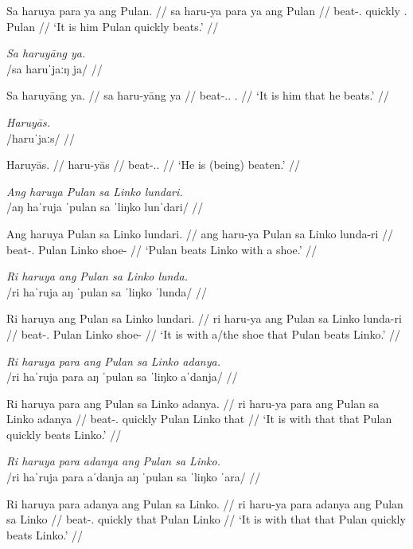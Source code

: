 \documentclass[12pt,a4paper]{scrartcl}
\newcommand{\TsgM}{{\Tsg}.{\M}}
\begin{document}
\gla Sa haruya para ya ang Pulan. //
\glb sa haru-ya para ya ang Pulan //
\glc \PatT{} beat-\TsgM{} quickly \TsgM{} \Aarg{} Pulan //
\glft `It is him Pulan quickly beats.' //
\endgl\xe

\ex\begingl
\glpreamble \textit{Sa haruyāng ya.}\\
	/sa haruˈjaːŋ ja/ //

\gla Sa haruyāng ya. //
\glb sa haru-yāng ya //
\glc \PatT{} beat-\TsgM{}.\Aarg{} \TsgM{} //
\glft `It is him that he beats.' //
\endgl\xe

\ex\begingl
\glpreamble \textit{Haruyās.}\\
	/haruˈjaːs/ //

\gla Haruyās. //
\glb haru-yās //
\glc beat-\TsgM{}.\Parg{} //
\glft `He is (being) beaten.' //
\endgl\xe

\ex\begingl
\glpreamble \textit{Ang haruya Pulan sa Linko lundari.}\\
	/aŋ haˈruja ˈpulan sa ˈliŋko lunˈdari/ //

\gla Ang haruya Pulan sa Linko lundari. //
\glb ang haru-ya Pulan sa Linko lunda-ri //
\glc \AgtT{} beat-\TsgM{} Pulan \Parg{} Linko shoe-\Ins{} //
\glft `Pulan beats Linko with a shoe.' //
\endgl\xe

\ex\begingl
\glpreamble \textit{Ri haruya ang Pulan sa Linko lunda.}\\
	/ri haˈruja aŋ ˈpulan sa ˈliŋko ˈlunda/ //

\gla Ri haruya ang Pulan sa Linko lundari. //
\glb ri haru-ya ang Pulan sa Linko lunda-ri //
\glc \InsT{} beat-\TsgM{} \Aarg{} Pulan \Parg{} Linko shoe-\Ins{} //
\glft `It is with a/the shoe that Pulan beats Linko.' //
\endgl\xe


\ex\begingl
\glpreamble \textit{Ri haruya para ang Pulan sa Linko adanya.}\\
	/ri haˈruja para aŋ ˈpulan sa ˈliŋko aˈdanja/ //

\gla Ri haruya para ang Pulan sa Linko adanya. //
\glb ri haru-ya para ang Pulan sa Linko adanya //
\glc \InsT{} beat-\TsgM{} quickly \Aarg{} Pulan \Parg{} Linko that //
\glft `It is with that that Pulan quickly beats Linko.' //
\endgl\xe

\ex\begingl
\glpreamble \textit{Ri haruya para adanya ang Pulan sa Linko.}\\
	/ri haˈruja para aˈdanja aŋ ˈpulan sa ˈliŋko ˈara/ //

\gla Ri haruya para adanya ang Pulan sa Linko. //
\glb ri haru-ya para adanya ang Pulan sa Linko //
\glc \InsT{} beat-\TsgM{} quickly that \Aarg{} Pulan \Parg{} Linko //
\glft `It is with that that Pulan quickly beats Linko.' //
\endgl\xe
\end{document}
